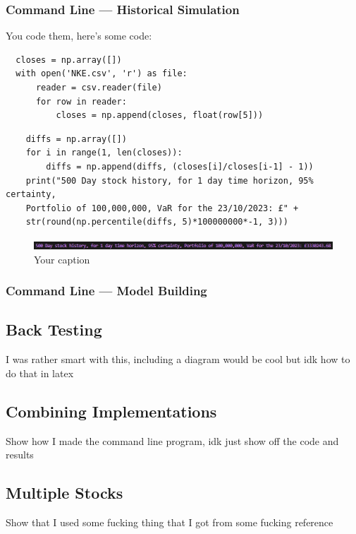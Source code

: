 \documentclass{article}
\begin{document}
\subsubsection{Command Line --- Historical Simulation}

You code them, here's some code:
\begin{verbatim}
  closes = np.array([])
  with open('NKE.csv', 'r') as file:
      reader = csv.reader(file)
      for row in reader:
          closes = np.append(closes, float(row[5]))
  \end{verbatim}

  \begin{verbatim}
    diffs = np.array([])
    for i in range(1, len(closes)): 
        diffs = np.append(diffs, (closes[i]/closes[i-1] - 1))
    print("500 Day stock history, for 1 day time horizon, 95% certainty, 
    Portfolio of 100,000,000, VaR for the 23/10/2023: £" + 
    str(round(np.percentile(diffs, 5)*100000000*-1, 3)))
    \end{verbatim}

  \begin{figure}[h]
    \centering
    \includegraphics[width=1.1\textwidth]{Images/Historical Command Line Result.png}
    \caption{Your caption}
    \label{fig:your_label}
  \end{figure}

  \subsubsection{Command Line --- Model Building}



\subsection{Back Testing}
I was rather smart with this, including a diagram would be cool but idk how to do that in latex

\subsection{Combining Implementations}
Show how I made the command line program, idk just show off the code and results

\subsection{Multiple Stocks}
Show that I used  some fucking thing that I got from some fucking reference
\end{document}

